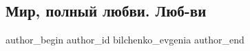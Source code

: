  
 
 
 
 
 
\subsection{Мир, полный любви. Люб-ви}
\label{sec:21_11_2021.fb.bilchenko_evgenia.1.mir_polnyj_ljubvi}
 
\ifcmt
 author_begin
   author_id bilchenko_evgenia
 author_end
\fi
